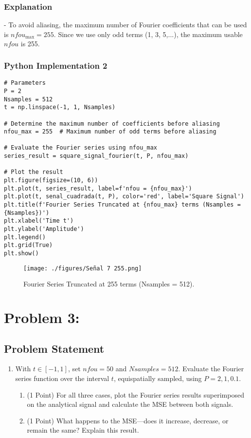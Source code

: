 \documentclass[10pt]{article}
\theoremstyle{definition}
\theoremstyle{remark}
\theoremstyle{definition}
\numberwithin{equation}{prob}
\begin{document}
\subsubsection*{Explanation}

- To avoid aliasing, the maximum number of Fourier coefficients that can be used is \( nfou_{\text{max}} = 255 \). Since we use only odd terms (1, 3, 5,...), the maximum usable \( nfou \) is 255.

\subsubsection*{Python Implementation 2}

\begin{lstlisting}
# Parameters
P = 2
Nsamples = 512
t = np.linspace(-1, 1, Nsamples)

# Determine the maximum number of coefficients before aliasing
nfou_max = 255  # Maximum number of odd terms before aliasing

# Evaluate the Fourier series using nfou_max
series_result = square_signal_fourier(t, P, nfou_max)

# Plot the result
plt.figure(figsize=(10, 6))
plt.plot(t, series_result, label=f'nfou = {nfou_max}')
plt.plot(t, senal_cuadrada(t, P), color='red', label='Square Signal')
plt.title(f'Fourier Series Truncated at {nfou_max} terms (Nsamples = {Nsamples})')
plt.xlabel('Time t')
plt.ylabel('Amplitude')
plt.legend()
plt.grid(True)
plt.show()
\end{lstlisting}

\begin{figure}[h!]
    \centering
    \texttt{[image: ./figures/Señal 7 255.png]}
    \caption{Fourier Series Truncated at 255 terms (Nsamples = 512).}
\end{figure}




\section*{Problem 3:}

\subsection*{Problem Statement}


\begin{enumerate}
    \item With \( t \in [-1, 1] \), set \( nfou = 50 \) and \( Nsamples = 512 \). Evaluate the Fourier series function over the interval \( t \), equispatially sampled, using \( P = 2, 1, 0.1 \).
    \begin{enumerate}
        \item (1 Point) For all three cases, plot the Fourier series results superimposed on the analytical signal and calculate the MSE between both signals.
        \item (1 Point) What happens to the MSE—does it increase, decrease, or remain the same? Explain this result.
    \end{enumerate}
\end{enumerate}
\end{document}
